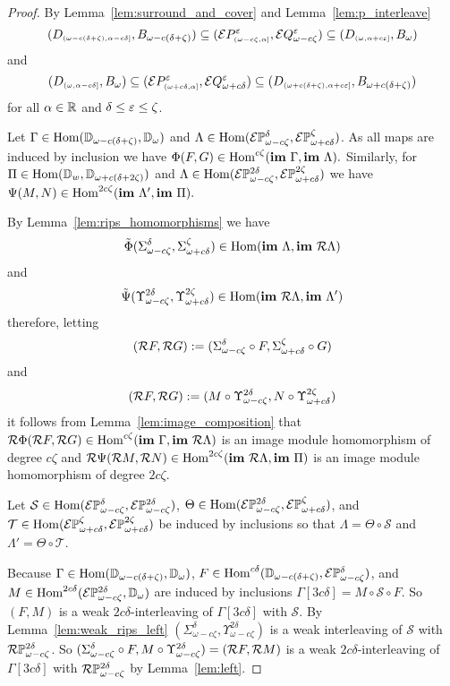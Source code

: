 \begin{proof}
  By Lemma~\ref{lem:surround_and_cover} and Lemma~\ref{lem:p_interleave}
  \[ (D_{\scriptscriptstyle (\omega-c(\delta+\zeta),\alpha-c\delta]},B_{\omega - c(\delta+\zeta)})\subseteq (\mathcal{E} P^\varepsilon_{\scriptscriptstyle (\omega-c\zeta,\alpha]},\mathcal{E} Q_{\omega - c\zeta}^\varepsilon)\subseteq (D_{\scriptscriptstyle (\omega,\alpha+c\varepsilon]},B_{\omega})\]
  and
  \[ (D_{\scriptscriptstyle (\omega,\alpha-c\delta]},B_{\omega})\subseteq (\mathcal{E} P^\varepsilon_{\scriptscriptstyle (\omega+c\delta,\alpha]},\mathcal{E} Q_{\omega + c{\delta}}^\varepsilon)\subseteq (D_{\scriptscriptstyle (\omega+c(\delta+\zeta),\alpha+c\varepsilon]},B_{\omega + c(\delta+\zeta)})\]
  for all $\alpha\in\mathbb{R}$ and $\delta\leq\varepsilon\leq\zeta$.

  Let $\Gamma\in\mathrm{Hom}(\mathbb{D}_{\omega-c(\delta+\zeta)},\mathbb{D}_{\omega})$ and $\Lambda\in\mathrm{Hom}(\mathcal{E} \mathbb{P}_{\omega-c\zeta}^{\delta},\mathcal{E} \mathbb{P}_{\omega+c\delta}^{\zeta})$.
  As all maps are induced by inclusion we have $\Phi(F, G)\in\mathrm{Hom}^{c\zeta}(\mathbf{im}~\Gamma, \mathbf{im}~\Lambda).$
  Similarly, for $\Pi\in\mathrm{Hom}(\mathbb{D}_{w},\mathbb{D}_{\omega+c(\delta+2\zeta)})$ and $\Lambda\in\mathrm{Hom}(\mathcal{E} \mathbb{P}_{\omega-c\zeta}^{2\delta},\mathcal{E} \mathbb{P}_{\omega+c\delta}^{2\zeta})$ we have $\Psi(M, N)\in\mathrm{Hom}^{2c\zeta}(\mathbf{im}~\Lambda',\mathbf{im}~\Pi).$

  By Lemma~\ref{lem:rips_homomorphisms} we have
  \[ \tilde{\Phi}(\Sigma_{\omega-c\zeta}^\delta,\Sigma_{\omega+c\delta}^\zeta)\in\mathrm{Hom}(\mathbf{im}~\Lambda,\mathbf{im}~\mathcal{R}\Lambda)\]
  and
  \[ \tilde{\Psi}(\Upsilon_{\omega-c\zeta}^{2\delta},\Upsilon_{\omega+c\delta}^{2\zeta})\in\mathrm{Hom}(\mathbf{im}~\mathcal{R}\Lambda,\mathbf{im}~\Lambda')\]
  therefore, letting
  \[ (\mathcal{R} F, \mathcal{R} G) := (\Sigma_{\omega-c\zeta}^\delta\circ F, \Sigma_{\omega+c\delta}^\zeta\circ G)\]
  and
  \[ (\mathcal{R} F, \mathcal{R} G) := (M\circ \Upsilon_{\omega-c\zeta}^{2\delta}, N\circ\Upsilon_{\omega+c\delta}^{2\zeta})\]
  it follows from Lemma~\ref{lem:image_composition} that $\mathcal{R} \Phi (\mathcal{R} F, \mathcal{R} G)\in\mathrm{Hom}^{c\zeta}(\mathbf{im}~\Gamma,\mathbf{im}~\mathcal{R}\Lambda)$ is an image module homomorphism of degree $c\zeta$ and $\mathcal{R}\Psi(\mathcal{R} M, \mathcal{R} N)\in\mathrm{Hom}^{2c\zeta}(\mathbf{im}~\mathcal{R}\Lambda,\mathbf{im}~\Pi)$ is an image module homomorphism of degree $2c\zeta$.


  Let $\mathcal{S}\in\mathrm{Hom}(\mathcal{E} \mathbb{P}_{\omega-c\zeta}^{\delta},\mathcal{E} \mathbb{P}_{\omega-c\zeta}^{2\delta})$, $\Theta\in\mathrm{Hom}(\mathcal{E} \mathbb{P}_{\omega-c\zeta}^{2\delta},\mathcal{E} \mathbb{P}_{\omega+c\delta}^{\zeta})$, and $\mathcal{T}\in\mathrm{Hom}(\mathcal{E} \mathbb{P}_{\omega+c\delta}^{\zeta},\mathcal{E} \mathbb{P}_{\omega+c\delta}^{2\zeta})$ be induced by inclusions so that $\Lambda = \Theta\circ \mathcal{S}$ and $\Lambda' = \Theta\circ \mathcal{T}$.

  Because $\Gamma\in\mathrm{Hom}(\mathbb{D}_{\omega-c(\delta+\zeta)},\mathbb{D}_{\omega})$, $F\in\mathrm{Hom}^{c\delta}(\mathbb{D}_{\omega-c(\delta+\zeta)}, \mathcal{E} \mathbb{P}_{\omega-c\zeta}^{\delta})$, and $M\in\mathrm{Hom}^{2c\delta}(\mathcal{E} \mathbb{P}_{\omega-c\zeta}^{2\delta}, \mathbb{D}_{\omega})$ are induced by inclusions $\Gamma[3c\delta] = M\circ\mathcal{S}\circ F$.
  So $(F, M)$ is a weak $2c\delta$-interleaving of $\Gamma[3c\delta]$ with $\mathcal{S}$.
  By Lemma~\ref{lem:weak_rips_left} $(\Sigma_{\omega-c\zeta}^{\delta},\Upsilon_{\omega-c\zeta}^{2\delta})$ is a weak interleaving of $\mathcal{S}$ with $\mathcal{R}\mathbb{P}_{\omega-c\zeta}^{2\delta}$.
  So $(\Sigma_{\omega-c\zeta}^{\delta}\circ F, M\circ \Upsilon_{\omega-c\zeta}^{2\delta}) = (\mathcal{R} F, \mathcal{R} M)$ is a weak $2c\delta$-interleaving of $\Gamma[3c\delta]$ with $\mathcal{R}\mathbb{P}_{\omega-c\zeta}^{2\delta}$ by Lemma~\ref{lem:left}.


\end{proof}
